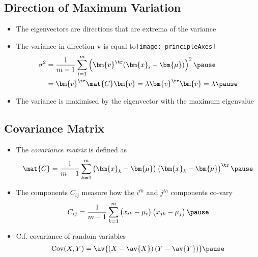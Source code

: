\begin{slide}
\section[-1]{Direction of Maximum Variation}

\begin{PauseHighLight}
  \begin{itemize}
  \item The eigenvectors are directions that are extrema of the variance\pause
  \item The variance in direction $\bm{v}$ is equal
    to\hfill\texttt{[image: principleAxes]}
    \begin{align*}
       \sigma^2 &= \frac{1}{m-1} \sum_{i=1}^m \left( \bm{v}^\tr
         (\bm{x}_i-\bm{\mu}) \right)^2\pause
       \\ 
       &= \bm{v}^\tr \mat{C} \bm{v} = \lambda \bm{v}^\tr \bm{v} = \lambda\pause
    \end{align*}
  \item The variance is maximised by the eigenvector with the maximum
    eigenvalue\pause
  \end{itemize}
\end{PauseHighLight}


\end{slide}


\begin{slide}
\section[-2]{Covariance Matrix}

\begin{PauseHighLight}

\begin{itemize}\squeeze
\item The \emph{covariance matrix} is defined as
  \begin{displaymath}
    \mat{C} = \frac{1}{m-1} \sum_{k=1}^m \left(\strut
    \bm{x}_k-\bm{\mu}\right) \left(\strut
    \bm{x}_k-\bm{\mu}\right)^\tr\pause 
  \end{displaymath}
\item The components $C_{ij}$ measure how the $i^{th}$ and $j^{th}$
  components co-vary
  \begin{align*}
    C_{ij} = \frac{1}{m-1} \sum_{k=1}^m \left(\strut
    x_{ik}-\mu_i\right) \left(\strut
    x_{jk}-\mu_j\right)\pause 
  \end{align*}
\item C.f. covariance of random variables
  \begin{align*}
     \mathrm{Cov}(X,Y) = \av{(X-\av{X})\,(Y-\av{Y})}\pause
  \end{align*}
\end{itemize}

\end{PauseHighLight}
\end{slide}

